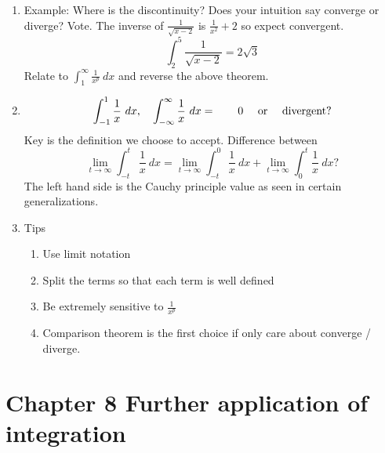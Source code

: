 \documentclass{article}
\newcommand{\ds}{\displaystyle}
\begin{document}
\begin{enumerate}
\item Example:  Where is the discontinuity? Does your intuition say converge or diverge? Vote. The inverse of $\frac{1}{\sqrt{x-2}}$ is $\frac{1}{x^2}+2$ so expect convergent. 
$$
\int_2^5\frac{1}{\sqrt{x-2}} = 2\sqrt{3}
$$
Relate to $\ds \int_1^{\infty} \frac{1}{x^p}~dx$ and reverse the above theorem.

\item 
$$
\int_{-1}^1\frac{1}{x} ~dx, \quad \int_{-\infty}^\infty \frac{1}{x}~dx = \quad \quad 0 \text{ \quad or \quad divergent}?
$$
Key is the definition we choose to accept. Difference between
$$
\lim_{t\rightarrow \infty}\int_{-t}^t \frac{1}{x}~dx  = \lim_{t\rightarrow \infty}\int_{-t}^0\frac{1}{x}~dx+\lim_{t\rightarrow \infty}\int_0^t\frac{1}{x}~dx ?
$$
The left hand side is the Cauchy principle value as seen in certain generalizations.

\item Tips
\begin{enumerate}
\item Use limit notation
\item Split the terms so that each term is well defined
\item Be extremely sensitive to $\displaystyle\frac{1}{x^p}$
\item Comparison theorem is the first choice if only care about converge / diverge.
\end{enumerate}
\end{enumerate}


\section{Chapter 8 Further application of integration}
\end{document}
